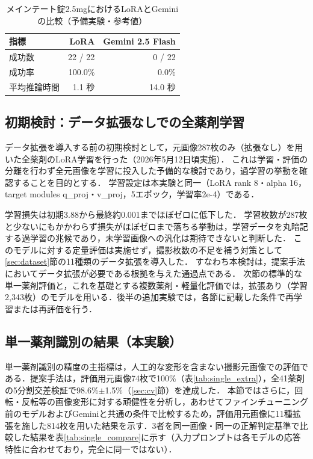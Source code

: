 \documentclass[dvipdfmx]{jsarticle}
\begin{document}
\begin{table}[htbp]
\centering
\caption{メインテート錠2.5mgにおけるLoRAとGeminiの比較（予備実験・参考値）}
\label{tab:vs_gemini}
\begin{tabular}{lrr}
\hline
指標 & LoRA & Gemini 2.5 Flash \\
\hline
成功数 & 22 / 22 & 0 / 22 \\
成功率 & 100.0\% & 0.0\% \\
平均推論時間 & 1.1 秒 & 14.0 秒 \\
\hline
\end{tabular}
\end{table}

\subsection{初期検討：データ拡張なしでの全薬剤学習}\label{sec:noaug}

データ拡張を導入する前の初期検討として，元画像287枚のみ（拡張なし）を用いた全薬剤のLoRA学習を行った（2026年5月12日頃実施）．
これは学習・評価の分離を行わず全元画像を学習に投入した予備的な検討であり，過学習の挙動を確認することを目的とする．
学習設定は本実験と同一（LoRA rank 8・alpha 16，target modules q\_proj・v\_proj，5エポック，学習率2e-4）である．

学習損失は初期3.88から最終約0.001までほぼゼロに低下した．
学習枚数が287枚と少ないにもかかわらず損失がほぼゼロまで落ちる挙動は，学習データを丸暗記する過学習の兆候であり，未学習画像への汎化は期待できないと判断した．
このモデルに対する定量評価は実施せず，撮影枚数の不足を補う対策として\ref{sec:dataset}節の11種類のデータ拡張を導入した．
すなわち本検討は，提案手法においてデータ拡張が必要である根拠を与えた通過点である．
次節の標準的な単一薬剤評価と，これを基礎とする複数薬剤・軽量化評価では，拡張あり（学習2,343枚）のモデルを用いる．後半の追加実験では，各節に記載した条件で再学習または再評価を行う．

\subsection{単一薬剤識別の結果（本実験）}\label{sec:single_result}

単一薬剤識別の精度の主指標は，人工的な変形を含まない撮影元画像での評価である．提案手法は，評価用元画像74枚で100\%（表\ref{tab:single_extra}），全41薬剤の5分割交差検証で98.6\%$\pm$1.5\%（\ref{sec:cv}節）を達成した．
本節ではさらに，回転・反転等の画像変形に対する頑健性を分析し，あわせてファインチューニング前のモデルおよびGeminiと共通の条件で比較するため，評価用元画像に11種拡張を施した814枚を用いた結果を示す．3者を同一画像・同一の正解判定基準で比較した結果を表\ref{tab:single_compare}に示す（入力プロンプトは各モデルの応答特性に合わせており，完全に同一ではない）．
\end{document}

